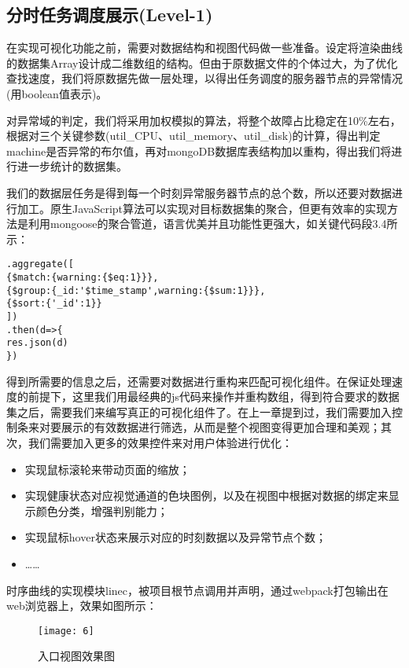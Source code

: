 \subsection{分时任务调度展示(Level-1)}
在实现可视化功能之前，需要对数据结构和视图代码做一些准备。设定将渲染曲线的数据集Array设计成二维数组的结构。但由于原数据文件的个体过大，为了优化查找速度，我们将原数据先做一层处理，以得出任务调度的服务器节点的异常情况(用boolean值表示)。

对异常域的判定，我们将采用加权模拟的算法，将整个故障占比稳定在10\%左右，根据对三个关键参数(util\_CPU、util\_memory、util\_disk)的计算，得出判定machine是否异常的布尔值，再对mongoDB数据库表结构加以重构，得出我们将进行进一步统计的数据集。

我们的数据层任务是得到每一个时刻异常服务器节点的总个数，所以还要对数据进行加工。原生JavaScript算法可以实现对目标数据集的聚合，但更有效率的实现方法是利用mongoose的聚合管道，语言优美并且功能性更强大，如关键代码段3.4所示：

\begin{lstlisting}[caption=管道实现聚合查询,frame=shadowbox]
.aggregate([
{$match:{warning:{$eq:1}}},
{$group:{_id:'$time_stamp',warning:{$sum:1}}},
{$sort:{'_id':1}}
])
.then(d=>{
res.json(d)
})
\end{lstlisting}

得到所需要的信息之后，还需要对数据进行重构来匹配可视化组件。在保证处理速度的前提下，这里我们用最经典的js代码来操作并重构数组，得到符合要求的数据集之后，需要我们来编写真正的可视化组件了。在上一章提到过，我们需要加入控制条来对要展示的有效数据进行筛选，从而是整个视图变得更加合理和美观；其次，我们需要加入更多的效果控件来对用户体验进行优化：

\begin{itemize}
	\item 实现鼠标滚轮来带动页面的缩放；
	\item 实现健康状态对应视觉通道的色块图例，以及在视图中根据对数据的绑定来显示颜色分类，增强判别能力；
	\item 实现鼠标hover状态来展示对应的时刻数据以及异常节点个数；
	\item ……
\end{itemize}

时序曲线的实现模块linec，被项目根节点调用并声明，通过webpack打包输出在web浏览器上，效果如图所示：

\begin{figure}[h]
	\centering
	\texttt{[image: 6]}
	\caption{入口视图效果图}
	\label{pic-8}
\end{figure}

